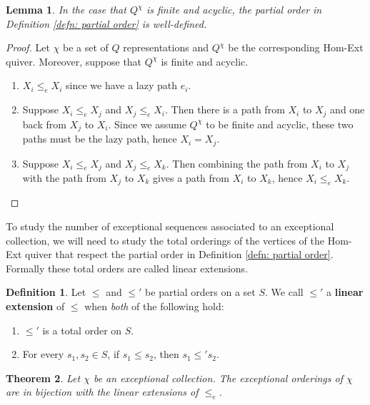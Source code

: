 \documentclass[12pt]{amsart}
\theoremstyle{plain}
\newtheorem{thm}{Theorem}[section]
\newtheorem{lem}[thm]{Lemma}
\theoremstyle{definition}
\newtheorem{defn}{Definition}[section]
\theoremstyle{remark}
\newcommand{\kisays}[1]{\marginpar{\color{ki}#1\color{black}}}
\begin{document}
\begin{lem}\label{lem: partial order well-defined}
In the case that $Q^{\chi}$ is finite and acyclic, the partial order in Definition \ref{defn: partial order} is well-defined.
\end{lem}


\begin{proof} Let $\chi$ be a set of $Q$ representations and $Q^{\chi}$ be the corresponding Hom-Ext quiver. Moreover, suppose that $Q^{\chi}$ is finite and acyclic. 

\begin{enumerate}
\item $X_i \leq_e X_i$ since we have a lazy path $e_i$.
\item Suppose $X_i \leq_e X_j$ and $X_j \leq_e X_i$. Then there is a path from $X_i$ to $X_j$ and one back from $X_j$ to $X_i$. Since we assume $Q^{\chi}$ to be finite and acyclic, these two paths must be the lazy path, hence $X_i = X_j$.
\item Suppose $X_i \leq_e X_j$ and $X_j \leq_e X_k$. Then combining the path from $X_i$ to $X_j$ with the path from $X_j$ to $X_k$ gives a path from $X_i$ to $X_k$, hence $X_i \leq_e X_k$.
\end{enumerate}
\end{proof}

To study the number of exceptional sequences associated to an exceptional collection, we will need to study the total orderings of the vertices of the Hom-Ext quiver that respect the partial order in Definition \ref{defn: partial order}. Formally these total orders are called linear extensions.

\begin{defn}
Let $\leq$ and $\leq'$ be partial orders on a set $S$. We call $\leq'$ a \textbf{linear extension} of $\leq$ when {\color{black} \textit{both}} of the following hold:

\begin{enumerate}
\item $\leq'$ is a total order {\color{black} on $S$}.
\item For every $s_1,s_2 \in S$, if $s_1 \leq s_2$, then $s_1 \leq' s_2$.
\end{enumerate}
\end{defn}

\begin{thm}\label{thm: linear extensions and exceptional sequences}
Let $\chi$ be an exceptional collection. The exceptional orderings of $\chi$ are in bijection with the linear extensions of $\leq_e$. 
\end{thm}
\end{document}
